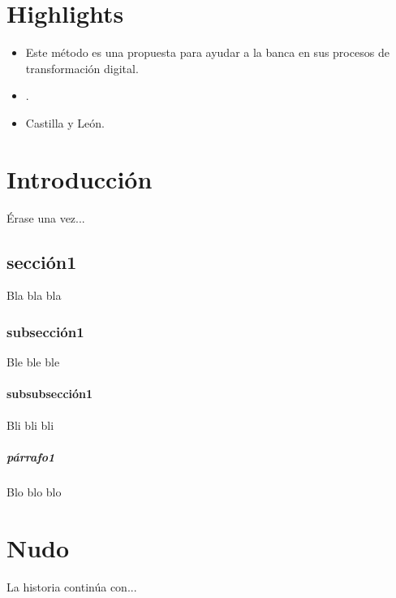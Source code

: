 \documentclass[a4paper,openright,12pt]{book}
\begin{document}
\chapter*{Highlights} %

\begin{itemize}
    \item Este método es una propuesta para ayudar a la banca en sus procesos de transformación digital.
    \item .
    \item Castilla y León.
    
\end{itemize}


\tableofcontents %

\cleardoublepage
{} %
\listoffigures %

\cleardoublepage
{} %
\listoftables %

\chapter{Introducción}\label{cap.introduccion}
Érase una vez...
\section{sección1}
Bla bla bla
\subsection{subsección1}
Ble ble ble
\subsubsection{subsubsección1}
Bli bli bli
\paragraph{párrafo1}
Blo blo blo

\chapter{Nudo}\label{cap.nudo}
La historia continúa con...
\end{document}
